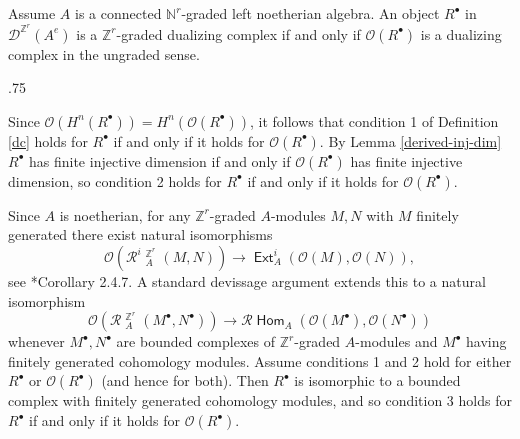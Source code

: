 \documentclass[11pt,fleqn]{article}
\makeatletter
\renewenvironment{proof}[1][\textit{Proof}]{\par
  \pushQED{\qed}%
  \normalfont \topsep.75\paraskip\relax
  \trivlist
  \item[\hskip\labelsep
        \itshape
    #1\@addpunct{.}]\ignorespaces
}{%
  \popQED\endtrivlist\@endpefalse
}
\newcommand\NN{\mathbb N}
\newcommand\ZZ{\mathbb Z}
\renewcommand\to{\longrightarrow}
\renewcommand\O{\mathcal O}
\newcommand\R{\mathcal R}
\newcommand\D{\mathcal D}
\DeclareMathOperator\Hom{\mathsf{Hom}}
\DeclareMathOperator\Ext{\mathsf{Ext}}
\DeclareMathOperator\HOM{\underline{\mathsf{Hom}}}
\makeatother
\begin{document}
\begin{Proposition}
Assume $A$ is a connected $\NN^r$-graded left noetherian algebra.
An object $R^\bullet$ in $\D^{\ZZ^r}(A^e)$ is a $\ZZ^r$-graded dualizing 
complex if and only if $\O(R^\bullet)$ is a dualizing complex in the ungraded 
sense.
\end{Proposition}
\begin{proof}
Since $\O(H^n(R^\bullet)) = H^n(\O(R^\bullet))$, it follows that condition 1 
of Definition \ref{dc} holds for $R^\bullet$ if and only if it holds for 
$\O(R^\bullet)$. By Lemma \ref{derived-inj-dim} $R^\bullet$ has finite 
injective dimension if and only if $\O(R^\bullet)$ has finite injective 
dimension, so condition 2 holds for $R^\bullet$ if and only if it holds for 
$\O(R^\bullet)$.

Since $A$ is noetherian, for any $\ZZ^r$-graded $A$-modules $M,N$ with $M$ 
finitely generated there exist natural isomorphisms
\[
  \O(\R^i\HOM_A^{\ZZ^r}(M,N)) \to \Ext^i_A(\O(M),\O(N)),
\]
see \cite{NV-graded-book3}*{Corollary 2.4.7}. A standard devissage argument 
extends this to a natural isomorphism
\[
  \O(\R\HOM_A^{\ZZ^r}(M^\bullet, N^\bullet)) 
    \to \R\Hom_A(\O(M^\bullet), \O(N^\bullet))
\]
whenever $M^\bullet, N^\bullet$ are bounded complexes of $\ZZ^r$-graded 
$A$-modules and $M^\bullet$ having finitely generated cohomology modules. 
Assume conditions 1 and 2 hold for either $R^\bullet$ or $\O(R^\bullet)$ (and 
hence for both). Then $R^\bullet$ is isomorphic to a bounded complex with 
finitely generated cohomology modules, and so condition 3 holds for $R^\bullet$
if and only if it holds for $\O(R^\bullet)$.
\end{proof}

\begin{bibdiv}
\begin{biblist}
\end{biblist}
\end{bibdiv}
\end{document}
